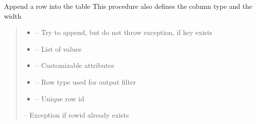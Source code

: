 \documentclass[letterpaper,10pt,english]{sphinxmanual}
\begin{document}
\begin{savenotes}
\begin{fulllineitems}
\begin{savenotes}\begin{fulllineitems}
\label{\detokenize{eezz:eezz.table.TTable.append}}
\pysigstartsignatures
{}
\pysigstopsignatures
\sphinxAtStartPar
Append a row into the table
This procedure also defines the column type and the width
\begin{quote}\begin{description}
\begin{itemize}
\item {} 
\sphinxAtStartPar
{} – Try to append, but do not throw exception, if key exists

\item {} 
\sphinxAtStartPar
{} – List of values

\item {} 
\sphinxAtStartPar
{} – Customizable attributes

\item {} 
\sphinxAtStartPar
{} – Row type used for output filter

\item {} 
\sphinxAtStartPar
{} – Unique row id

\end{itemize}

\sphinxAtStartPar
{} – Exception if row\sphinxhyphen{}id already exists

\end{description}\end{quote}


\end{fulllineitems}
\end{savenotes}
\end{fulllineitems}
\end{savenotes}
\end{document}
